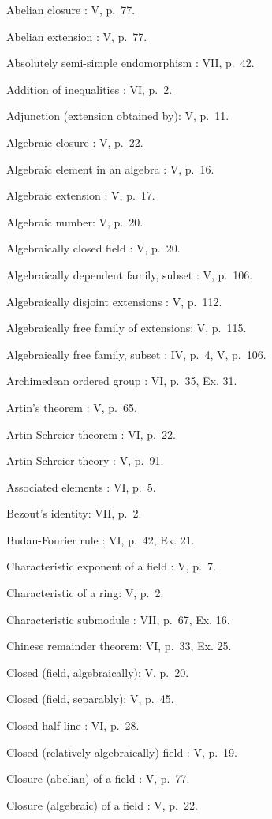 
Abelian closure : V, p.~77.

Abelian extension : V, p.~77.

Absolutely semi-simple endomorphism : VII, p.~42.

Addition of inequalities : VI, p.~2.

Adjunction (extension obtained by): V, p.~11.

Algebraic closure : V, p.~22.

Algebraic element in an algebra : V, p.~16.

Algebraic extension : V, p.~17.

Algebraic number: V, p.~20.

Algebraically closed field : V, p.~20.

Algebraically dependent family, subset : V, p.~106.

Algebraically disjoint extensions : V, p.~112.

Algebraically free family of extensions: V, p.~115.

Algebraically free family, subset : IV, p.~4, V, p.~106.

Archimedean ordered group : VI, p.~35, Ex. 31.

Artin's theorem : V, p.~65.

Artin-Schreier theorem : VI, p.~22.

Artin-Schreier theory : V, p.~91.

Associated elements : VI, p.~5.

Bezout's identity: VII, p.~2.

Budan-Fourier rule : VI, p.~42, Ex. 21.

Characteristic exponent of a field : V, p.~7.

Characteristic of a ring: V, p.~2.

Characteristic submodule : VII, p.~67, Ex. 16.

Chinese remainder theorem: VI, p.~33, Ex. 25.

Closed (field, algebraically): V, p.~20.

Closed (field, separably): V, p.~45.

Closed half-line : VI, p.~28.

Closed (relatively algebraically) field : V, p.~19.

Closure (abelian) of a field : V, p.~77.

Closure (algebraic) of a field : V, p.~22.

